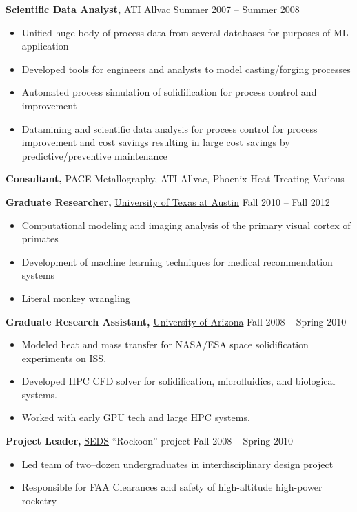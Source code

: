 \documentclass{res}
\begin{document}
\begin{resume}
{\bf Scientific Data Analyst,} \href{https://www.atimetals.com/}{ATI Allvac} \hfill
Summer 2007 -- Summer 2008
\begin{itemize} \itemsep -2pt
  \item Unified huge body of process data from several databases for purposes of ML application
  \item Developed tools for engineers and analysts to model casting/forging processes
  \item Automated process simulation of solidification for process control and improvement
  \item Datamining and scientific data analysis for process control for process improvement and cost savings
    resulting in large cost savings by predictive/preventive maintenance
\end{itemize}

{\bf Consultant,} PACE Metallography, ATI Allvac, Phoenix Heat Treating \hfill Various

{\bf Graduate Researcher,} \href{https://www.utexas.edu/}{University of Texas at Austin} \hfill
Fall 2010 -- Fall 2012
\begin{itemize} \itemsep -2pt
  \item Computational modeling and imaging analysis of the primary visual cortex of primates
  \item Development of machine learning techniques for medical recommendation systems
  \item Literal monkey wrangling
\end{itemize}

{\bf Graduate Research Assistant,} \href{https://www.arizona.edu/}{University of Arizona} \hfill
Fall 2008 -- Spring 2010
\begin{itemize} \itemsep -2pt
  \item Modeled heat and mass transfer for NASA/ESA space solidification experiments on ISS.
  \item Developed HPC CFD solver for solidification, microfluidics, and biological systems.
  \item Worked with early GPU tech and large HPC systems.
\end{itemize}

{\bf Project Leader,}  \href{https://seds.arizona.edu/}{SEDS} ``Rockoon''  project \hfill   Fall 2008 -- Spring 2010
\begin{itemize} \itemsep -2pt
  \item Led team of two--dozen undergraduates in interdisciplinary design project
  \item Responsible for FAA Clearances and safety of high-altitude high-power rocketry
\end{itemize}


\end{resume}
\end{document}
